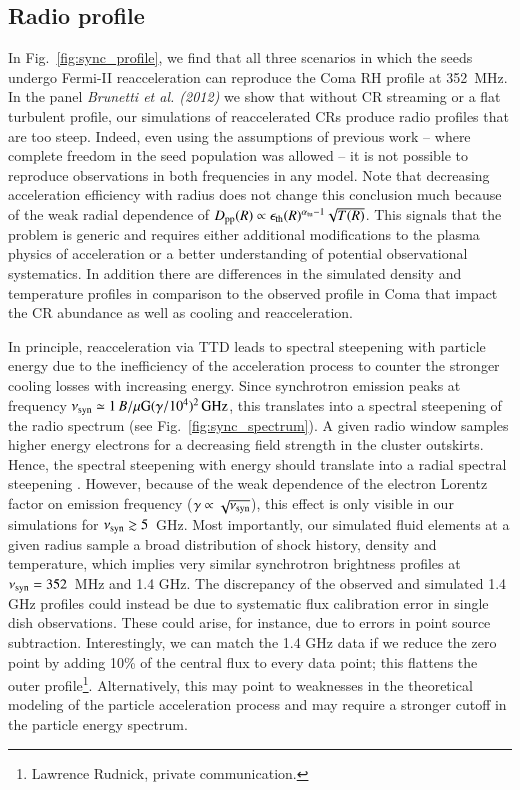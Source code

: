 \documentclass[a4paper,fleqn,usenatbib]{mnras}
\begin{document}
\subsection{Radio profile}
In Fig.~\ref{fig:sync_profile}, we find that all three scenarios in
which the seeds undergo Fermi-II reacceleration can reproduce the Coma
RH profile at 352~MHz. In the panel {\it Brunetti et al. (2012)} we
show that without CR streaming or a flat turbulent profile, our
simulations of reaccelerated CRs produce radio profiles that are too
steep. Indeed, even using the assumptions of previous work -- where
complete freedom in the seed population was allowed -- it is not
possible to reproduce observations in both frequencies in any
model. Note that decreasing acceleration efficiency with radius does
not change this conclusion much because of the weak radial dependence
of $D_{\mathrm{pp}}(R)\propto
\epsilon_{\mathrm{th}}(R)^{\alpha_{\mathrm{tu}}-1}\sqrt{T(R)}$. This
signals that the problem is generic and requires either additional
modifications to the plasma physics of acceleration or a better
understanding of potential observational systematics. In addition
there are differences in the simulated density and temperature
profiles in comparison to the observed profile in Coma that impact the
CR abundance as well as cooling and reacceleration.

In principle, reacceleration via TTD leads to spectral steepening with
particle energy due to the inefficiency of the acceleration process to
counter the stronger cooling losses with increasing energy. Since
synchrotron emission peaks at frequency $\nu_{\mathrm{syn}}\simeq 1\,
B/\mu{\mathrm{G}} (\gamma/10^4)^2\,{\mathrm{GHz}}$, this translates into a
spectral steepening of the radio spectrum (see
Fig.~\ref{fig:sync_spectrum}). A given radio window samples higher
energy electrons for a decreasing field strength in the cluster
outskirts. Hence, the spectral steepening with energy should translate
into a radial spectral steepening \citep{brunetti12}. However, because
of the weak dependence of the electron Lorentz factor on emission
frequency ($\gamma\propto\sqrt{\nu_{\mathrm{syn}}}$), this effect is only
visible in our simulations for $\nu_{\mathrm{syn}}\gtrsim5$~GHz. Most
importantly, our simulated fluid elements at a given radius sample a
broad distribution of shock history, density and temperature, which
implies very similar synchrotron brightness profiles at
$\nu_{\mathrm{syn}}=352$~MHz and 1.4 GHz. The discrepancy of the observed
and simulated 1.4 GHz profiles could instead be due to systematic flux
calibration error in single dish observations. These could arise, for
instance, due to errors in point source subtraction. Interestingly, we
can match the 1.4 GHz data if we reduce the zero point by adding 10\%
of the central flux to every data point; this flattens the outer
profile\footnote{Lawrence Rudnick, private communication.}.
Alternatively, this may point to weaknesses in the theoretical
modeling of the particle acceleration process and may require a
stronger cutoff in the particle energy spectrum.
\end{document}
